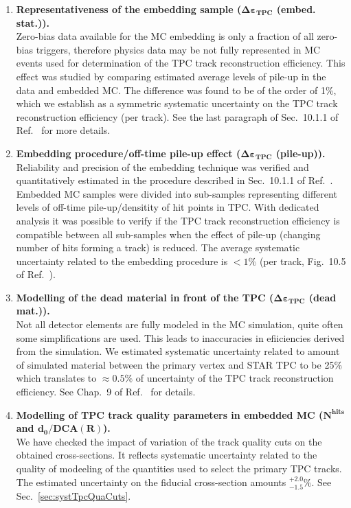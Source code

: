 \begin{enumerate}
 \item \textbf{Representativeness of the embedding sample ($\bm{\Delta\varepsilon_{\text{TPC}}}$ (embed. stat.)).}\\
 Zero-bias data available for the MC embedding is only a fraction of all zero-bias triggers, therefore physics data may be not fully represented in MC events used for determination of the TPC track reconstruction efficiency. This effect was studied by comparing estimated average levels of pile-up in the data and embedded MC. The difference was found to be of the order of 1\%, which we establish as a symmetric systematic uncertainty on the TPC track reconstruction efficiency (per track). See the last paragraph of Sec.~10.1.1 of Ref.~\cite{supplementaryNote} for more details.
 \item \textbf{Embedding procedure/off-time pile-up effect ($\bm{\Delta\varepsilon_{\text{TPC}}}$ (pile-up)).}\\
 Reliability and precision of the embedding technique was verified and quantitatively estimated in the procedure described in Sec.~10.1.1 of Ref.~\cite{supplementaryNote}. Embedded MC samples were divided into sub-samples representing different levels of off-time pile-up/densitity of hit points in TPC. With dedicated analysis it was possible to verify if the TPC track reconstruction efficiency is compatible between all sub-samples when the effect of pile-up (changing number of hits forming a track) is reduced. The average systematic uncertainty related to the embedding procedure is $<1\%$ (per track, Fig.~10.5 of Ref.~\cite{supplementaryNote}).
 \item \textbf{Modelling of the dead material in front of the TPC ($\bm{\Delta\varepsilon_{\text{TPC}}}$ (dead mat.)).}\\
 Not all detector elements are fully modeled in the MC simulation, quite often some simplifications are used. This leads to inaccuracies in efiiciencies derived from the simulation. We estimated systematic uncertainty related to amount of simulated material between the primary vertex and STAR TPC to be 25\% which translates to $\approx 0.5\%$ of uncertainty of the TPC track reconstruction efficiency. See Chap.~9 of Ref.~\cite{supplementaryNote} for details.
 \item \textbf{Modelling of TPC track quality parameters in embedded MC ($\bm{N^{\text{hits}}}$ and $\bm{d_{0}/\text{DCA}(R)}$).}\\
 We have checked the impact of variation of the track quality cuts on the obtained cross-sections. It reflects systematic uncertainty related to the quality of modeeling of the quantities used to select the primary TPC tracks. The estimated uncertainty on the fiducial cross-section amounts $^{+2.0}_{-1.5}\%$. See Sec.~\ref{sec:systTpcQuaCuts}.

\end{enumerate}

